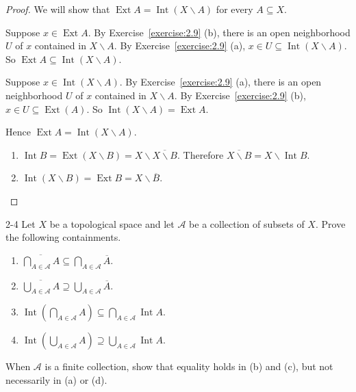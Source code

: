 \begin{proof}
	We will show that $\operatorname{Ext}A = \operatorname{Int}(X\smallsetminus A)$ for every $A\subseteq X$.

	Suppose $x\in \operatorname{Ext}A$. By Exercise~\ref{exercise:2.9} (b), there is an open neighborhood $U$ of $x$ contained in $X\smallsetminus A$. By Exercise~\ref{exercise:2.9} (a), $x\in U\subseteq \operatorname{Int}(X\smallsetminus A)$. So $\operatorname{Ext}A \subseteq \operatorname{Int}(X\smallsetminus A)$.

	Suppose $x\in \operatorname{Int}(X\smallsetminus A)$. By Exercise~\ref{exercise:2.9} (a), there is an open neighborhood $U$ of $x$ contained in $X\smallsetminus A$. By Exercise~\ref{exercise:2.9} (b), $x\in U\subseteq \operatorname{Ext}(A)$. So $\operatorname{Int}(X\smallsetminus A) = \operatorname{Ext} A$.

	Hence $\operatorname{Ext}A = \operatorname{Int}(X\smallsetminus A)$.
	\begin{enumerate}[label={(\alph*)}]
		\item $\operatorname{Int}B = \operatorname{Ext}(X\smallsetminus B) = X\smallsetminus\overline{X\smallsetminus B}$. Therefore $\overline{X\smallsetminus B} = X\smallsetminus\operatorname{Int}B$.
		\item $\operatorname{Int}(X\smallsetminus B) = \operatorname{Ext}B = X\smallsetminus\overline{B}$.
	\end{enumerate}
\end{proof}

\begin{problem}{2-4}
Let $X$ be a topological space and let $\mathscr{A}$ be a collection of subsets of $X$. Prove
the following containments.

\begin{enumerate}[label={(\alph*)}]
	\item $\displaystyle\overline{\bigcap_{A\in\mathscr{A}}A} \subseteq \bigcap_{A\in\mathscr{A}}\overline{A}$.
	\item $\displaystyle\overline{\bigcup_{A\in\mathscr{A}}A} \supseteq \bigcup_{A\in\mathscr{A}}\overline{A}$.
	\item $\displaystyle\operatorname{Int}\left(\bigcap_{A\in\mathscr{A}}A\right)\subseteq \bigcap_{A\in\mathscr{A}}\operatorname{Int}A$.
	\item $\displaystyle\operatorname{Int}\left(\bigcup_{A\in\mathscr{A}}A\right)\supseteq \bigcup_{A\in\mathscr{A}}\operatorname{Int}A$.
\end{enumerate}

When $\mathscr{A}$ is a finite collection, show that equality holds in (b) and (c), but not necessarily in (a) or (d).
\end{problem}


